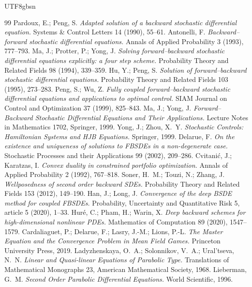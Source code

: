 \documentclass{article}
\theoremstyle{plain}
\theoremstyle{definition}
\theoremstyle{remark}
\numberwithin{equation}{section}
\begin{document}
\begin{CJK*}{UTF8}{gbsn}
\begin{thebibliography}{99}
 Pardoux, E.; Peng, S. \emph{Adapted solution of a backward stochastic differential equation.} Systems \& Control Letters 14 (1990), 55--61.
 Antonelli, F. \emph{Backward--forward stochastic differential equations.} Annals of Applied Probability 3 (1993), 777--793.
 Ma, J.; Protter, P.; Yong, J. \emph{Solving forward--backward stochastic differential equations explicitly: a four step scheme.} Probability Theory and Related Fields 98 (1994), 339--359.
 Hu, Y.; Peng, S. \emph{Solution of forward--backward stochastic differential equations.} Probability Theory and Related Fields 103 (1995), 273--283.
 Peng, S.; Wu, Z. \emph{Fully coupled forward--backward stochastic differential equations and applications to optimal control.} SIAM Journal on Control and Optimization 37 (1999), 825--843.
 Ma, J.; Yong, J. \emph{Forward--Backward Stochastic Differential Equations and Their Applications.} Lecture Notes in Mathematics 1702, Springer, 1999.
 Yong, J.; Zhou, X.~Y. \emph{Stochastic Controls: Hamiltonian Systems and HJB Equations.} Springer, 1999.
 Delarue, F. \emph{On the existence and uniqueness of solutions to FBSDEs in a non-degenerate case.} Stochastic Processes and their Applications 99 (2002), 209--286.
 Cvitani\'c, J.; Karatzas, I. \emph{Convex duality in constrained portfolio optimization.} Annals of Applied Probability 2 (1992), 767--818.
 Soner, H.~M.; Touzi, N.; Zhang, J. \emph{Wellposedness of second order backward SDEs.} Probability Theory and Related Fields 153 (2012), 149--190.
 Han, J.; Long, J. \emph{Convergence of the deep BSDE method for coupled FBSDEs.} Probability, Uncertainty and Quantitative Risk 5, article 5 (2020), 1--33.
 Hur\'e, C.; Pham, H.; Warin, X. \emph{Deep backward schemes for high-dimensional nonlinear PDEs.} Mathematics of Computation 89 (2020), 1547--1579.
 Cardaliaguet, P.; Delarue, F.; Lasry, J.-M.; Lions, P.-L. \emph{The Master Equation and the Convergence Problem in Mean Field Games.} Princeton University Press, 2019.
 Ladyzhenskaya, O.~A.; Solonnikov, V.~A.; Ural'tseva, N.~N. \emph{Linear and Quasi-linear Equations of Parabolic Type.} Translations of Mathematical Monographs 23, American Mathematical Society, 1968.
 Lieberman, G.~M. \emph{Second Order Parabolic Differential Equations.} World Scientific, 1996.
\end{thebibliography}

\clearpage %
\end{CJK*}
\end{document}
